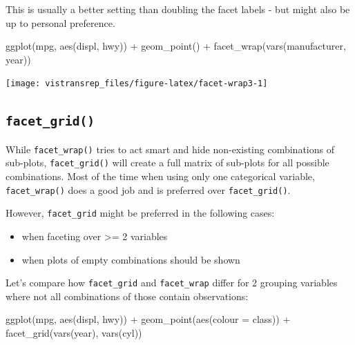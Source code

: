 \documentclass[]{book}
\newenvironment{Shaded}{}{}
\newcommand{\DataTypeTok}[1]{#1}
\newcommand{\KeywordTok}[1]{\textcolor[rgb]{0.00,0.00,1.00}{#1}}
\newcommand{\NormalTok}[1]{#1}
\newcommand{\OperatorTok}[1]{#1}
\newcommand{\StringTok}[1]{\textcolor[rgb]{0.00,0.50,0.50}{#1}}
\begin{document}
This is usually a better setting than doubling the facet labels - but might also be up to personal preference.

\begin{Shaded}
\begin{Highlighting}[]
\KeywordTok{ggplot}\NormalTok{(mpg, }\KeywordTok{aes}\NormalTok{(displ, hwy)) }\OperatorTok{+}
\StringTok{  }\KeywordTok{geom_point}\NormalTok{() }\OperatorTok{+}
\StringTok{  }\KeywordTok{facet_wrap}\NormalTok{(}\KeywordTok{vars}\NormalTok{(manufacturer, year))}
\end{Highlighting}
\end{Shaded}

\begin{flushright}\texttt{[image: vistransrep\_files/figure-latex/facet-wrap3-1]} \end{flushright}

\hypertarget{facet_grid}{%
\subsection{\texorpdfstring{\texttt{facet\_grid()}}{facet\_grid()}}\label{facet_grid}}

While \texttt{facet\_wrap()} tries to act smart and hide non-existing combinations of sub-plots, \texttt{facet\_grid()} will create a full matrix of sub-plots for all possible combinations.
Most of the time when using only one categorical variable, \texttt{facet\_wrap()} does a good job and is preferred over \texttt{facet\_grid()}.

However, \texttt{facet\_grid} might be preferred in the following cases:

\begin{itemize}
\item
  when faceting over \textgreater{}= 2 variables
\item
  when plots of empty combinations should be shown
\end{itemize}

Let's compare how \texttt{facet\_grid} and \texttt{facet\_wrap} differ for 2 grouping variables where not all combinations of those contain observations:

\begin{Shaded}
\begin{Highlighting}[]
\KeywordTok{ggplot}\NormalTok{(mpg, }\KeywordTok{aes}\NormalTok{(displ, hwy)) }\OperatorTok{+}
\StringTok{  }\KeywordTok{geom_point}\NormalTok{(}\KeywordTok{aes}\NormalTok{(}\DataTypeTok{colour =}\NormalTok{ class)) }\OperatorTok{+}
\StringTok{  }\KeywordTok{facet_grid}\NormalTok{(}\KeywordTok{vars}\NormalTok{(year), }\KeywordTok{vars}\NormalTok{(cyl))}
\end{Highlighting}
\end{Shaded}
\end{document}
